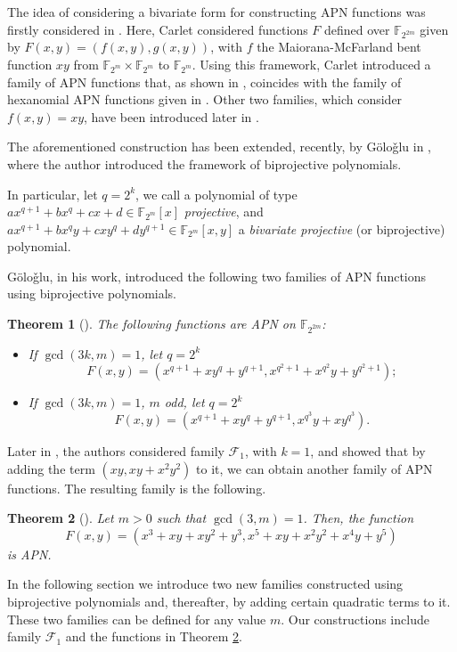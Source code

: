 \documentclass{article}
\newtheorem{theorem}{Theorem}
\newcommand{\cF}{\mathcal{F}}
\begin{document}
The idea of considering a bivariate form for constructing APN functions was firstly considered in \cite{CARLET1}. Here, Carlet considered functions $F$ defined over $\mathbb{F}_{2^{2m}}$ given by $F(x,y)=(f(x,y),g(x,y))$, with $f$ the Maiorana-McFarland bent function $xy$ from $\mathbb{F}_{2^m}\times\mathbb{F}_{2^m}$ to $\mathbb{F}_{2^m}$. 
Using this framework, Carlet introduced a family of APN functions that, as shown in \cite{CBC21}, coincides with the family of hexanomial APN functions given in \cite{BudCar08}.
Other two families, which consider  $f(x,y)=xy$, have been introduced later in \cite{tan19,pott}.

The aforementioned construction has been extended, recently, by G\"olo\v{g}lu in \cite{GOLOGLU}, where the author introduced the framework of biprojective polynomials.

In particular, let $q=2^k$, we call a polynomial of type $ax^{q+1} + bx^q + cx+d\in\mathbb{F}_{2^m}[x]$ \textit{projective}, and $ax^{q+1} + bx^q y + cxy^q + dy^{q+1}\in\mathbb{F}_{2^m}[x,y]$ a \textit{bivariate projective} (or biprojective) polynomial.

G\"olo\v{g}lu, in his work, introduced the following two families of APN functions using biprojective polynomials.

\begin{theorem}[\cite{GOLOGLU}]\label{th:gol}
The following functions are APN on $\mathbb{F}_{2^{2m}}$:
\begin{itemize}
\item[$\cF_1$:] If $\gcd(3k, m) = 1$, let $q=2^k$
$$
F(x,y)=(x^{q+1} +xy^{q}+y^{q+1},x^{q^2+1}+x^{q^2}y+y^{q^2+1});
$$
\item[$\cF_2$:] If $\gcd(3k, m) = 1$, $m$ odd, let $q=2^k$
$$
F(x,y)=(x^{q+1} +xy^{q}+y^{q+1},x^{q^3}y+xy^{q^3}).
$$
\end{itemize}
\end{theorem}

Later in \cite{LZLQ}, the authors considered family $\mathcal{F}_1$, with $k=1$, and showed that by adding the term $(xy,xy+x^2y^2)$ to it, we can obtain another family of APN functions. The resulting family is the following.

\begin{theorem}[\cite{LZLQ}]\label{th:lzlq}
Let $m>0$ such that $\gcd(3,m)=1$. Then, the function 
$$
F(x,y)=(x^{3}+xy +xy^{2}+y^{3},x^{5}+xy+x^2y^2+x^{4}y+y^{5})
$$
is APN.
\end{theorem}


In the following section we introduce two new families constructed using biprojective polynomials and, thereafter, by adding certain quadratic terms to it. These two families can be defined for any value $m$. Our constructions include family $\cF_1$ and the functions in Theorem \ref{th:lzlq}.
\end{document}
